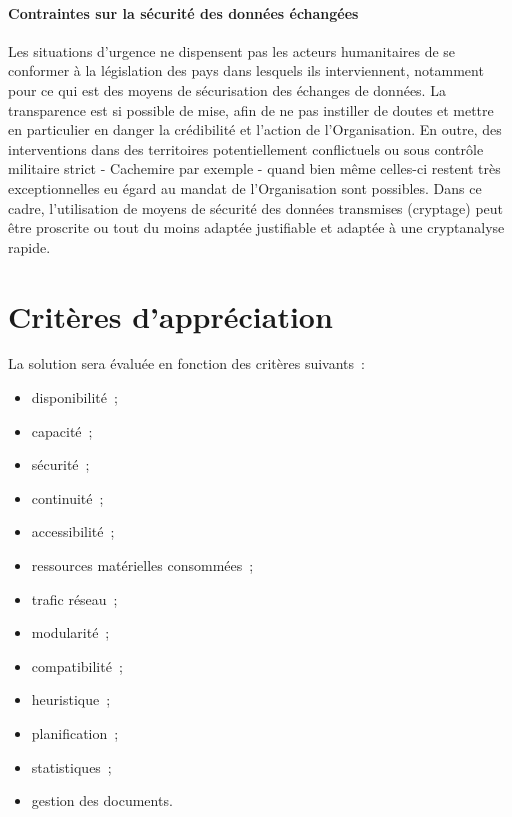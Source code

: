 \paragraph{Contraintes sur la sécurité des données échangées}
Les situations d'urgence ne dispensent pas les acteurs humanitaires de se conformer à la législation des pays dans lesquels ils interviennent, notamment pour ce qui est des moyens de sécurisation des échanges de données. La transparence est si possible de mise, afin de ne pas instiller de doutes et mettre en particulier en danger la crédibilité et l'action de l'Organisation. En outre, des interventions dans des territoires potentiellement conflictuels ou sous contrôle militaire strict - Cachemire par exemple - quand bien même celles-ci restent très exceptionnelles eu égard au mandat de l'Organisation sont possibles. Dans ce cadre, l'utilisation de moyens de sécurité des données transmises (cryptage) peut être proscrite ou tout du moins adaptée justifiable et adaptée à une cryptanalyse \og{}rapide\fg{}.

\section{Critères d'appréciation}
La solution sera évaluée en fonction des critères suivants~:
\begin{itemize}
\item disponibilité~;
\item capacité~;
\item sécurité~;
\item continuité~;
\item accessibilité~;
\item ressources matérielles consommées~;
\item trafic réseau~;
\item modularité~;
\item compatibilité~;
\item heuristique~;
\item planification~;
\item statistiques~;
\item gestion des documents.
\end{itemize}

